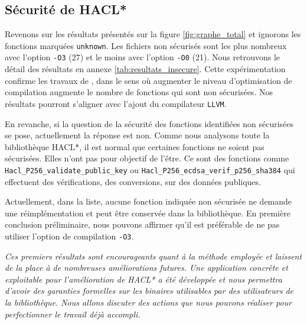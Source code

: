 \subsection*{Sécurité de HACL*}

Revenons sur les résultats présentés sur la figure \ref{fig:graphe_total} et ignorons les fonctions marquées \texttt{unknown}. Les fichiers non sécurisés sont les plus nombreux avec l'option \texttt{-O3} (27) et le moins avec l'option \texttt{-O0} (21). Nous retrouvons le détail des résultats en annexe \ref{tab:resultats_insecure}. Cette expérimentation confirme les travaux de \citeauthor{schneider2024breakingbadcompilersbreak}, dans le sens où augmenter le niveau d'optimisation de compilation augmente le nombre de fonctions qui sont non sécurisées. Nos résultats pourront s'aligner avec l'ajout du compilateur \texttt{LLVM}.\smallbreak 

En revanche, si la question de la sécurité des fonctions identifiées non sécurisées se pose, actuellement la réponse est non. Comme nous analysons toute la bibliothèque HACL*, il est normal que certaines fonctions ne soient pas sécurisées. Elles n'ont pas pour objectif de l'être. Ce sont des fonctions comme \texttt{Hacl\_P256\_\-vali\-date\_public\_key} ou \texttt{Hacl\_P256\_\-ecdsa\_\-verif\_p256\_sha384} qui effectuent des vérifications, des conversions, sur des données publiques. 

Actuellement, dans la liste, aucune fonction indiquée non sécurisée ne demande une réimplémentation et peut être conservée dans la bibliothèque. En première conclusion préliminaire, nous pouvons affirmer qu'il est préférable de ne pas utiliser l'option de compilation \texttt{-O3}.


\vfill
\textit{Ces premiers résultats sont encourageants quant à la méthode employée et laissent de la place à de nombreuses améliorations futures. Une application concrète et exploitable pour l'amélioration de HACL* a été développée et nous permettra d'avoir des garanties formelles sur les binaires utilisables par des utilisateurs de la bibliothèque. Nous allons discuter des actions que nous pouvons réaliser pour perfectionner le travail déjà accompli.}